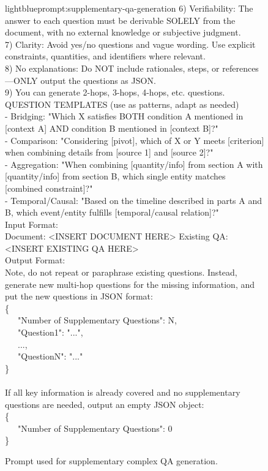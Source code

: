\documentclass{applemlr}
\numberwithin{equation}{section}
\begin{document}
\begin{figure}[t]
\begin{minipage}{1\textwidth}
\begin{promptbox}[\color{black}{Prompt for Supplementary Complex QA Generation}]{lightblue}{prompt:supplementary-qa-generation}
6) Verifiability: The answer to each question must be derivable SOLELY from the document, with no external knowledge or subjective judgment. \\
7) Clarity: Avoid yes/no questions and vague wording. Use explicit constraints, quantities, and identifiers where relevant. \\
8) No explanations: Do NOT include rationales, steps, or references—ONLY output the questions as JSON. \\
9) You can generate 2-hops, 3-hops, 4-hops, etc. questions. \\[6pt]
QUESTION TEMPLATES (use as patterns, adapt as needed) \\
- Bridging: "Which X satisfies BOTH condition A mentioned in [context A] AND condition B mentioned in [context B]?" \\
- Comparison: "Considering [pivot], which of X or Y meets [criterion] when combining details from [source 1] and [source 2]?" \\
- Aggregation: "When combining [quantity/info] from section A with [quantity/info] from section B, which single entity matches [combined constraint]?" \\
- Temporal/Causal: "Based on the timeline described in parts A and B, which event/entity fulfills [temporal/causal relation]?" \\[6pt]
Input Format: \\
Document: <INSERT DOCUMENT HERE>  Existing QA: <INSERT EXISTING QA HERE> \\[6pt]
Output Format: \\
Note, do not repeat or paraphrase existing questions. Instead, generate new multi-hop questions for the missing information, and put the new questions in JSON format: \\
\{ \\
\ \ \ "Number of Supplementary Questions": N, \\
\ \ \ "Question1": "...", \\
\ \ \ ..., \\
\ \ \ "QuestionN": "..." \\
\} \\
\\
If all key information is already covered and no supplementary questions are needed, output an empty JSON object: \\
\{ \\
\ \ \ "Number of Supplementary Questions": 0 \\
\}
\end{promptbox}
\end{minipage}
\caption{Prompt used for supplementary complex QA generation.}
\label{prompt_supplementary_qa_generation}
\end{figure}
\end{document}
